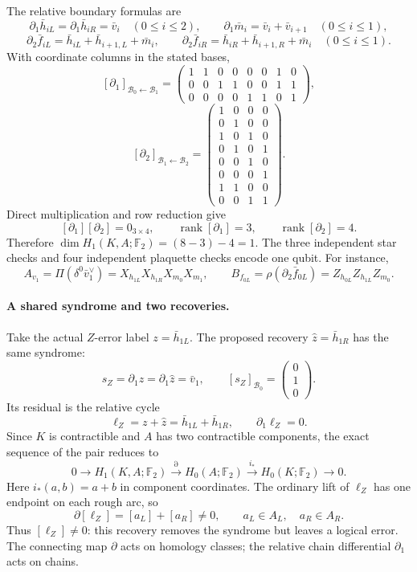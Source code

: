 The relative boundary formulas are
\[
 \partial_1\bar h_{iL}=\partial_1\bar h_{iR}=\bar v_i
 \quad(0\leq i\leq2),\qquad
 \partial_1\bar m_i=\bar v_i+\bar v_{i+1}\quad(0\leq i\leq1),
\]
\[
 \partial_2\bar f_{iL}=\bar h_{iL}+\bar h_{i+1,L}+\bar m_i,
 \qquad
 \partial_2\bar f_{iR}=\bar h_{iR}+\bar h_{i+1,R}+\bar m_i
 \quad(0\leq i\leq1).
\]
With coordinate columns in the stated bases,
\[
 [\partial_1]_{\mathcal B_0\leftarrow\mathcal B_1}
 =\begin{pmatrix}
 1&1&0&0&0&0&1&0\\
 0&0&1&1&0&0&1&1\\
 0&0&0&0&1&1&0&1
 \end{pmatrix},
\]
\[
 [\partial_2]_{\mathcal B_1\leftarrow\mathcal B_2}
 =\begin{pmatrix}
 1&0&0&0\\
 0&1&0&0\\
 1&0&1&0\\
 0&1&0&1\\
 0&0&1&0\\
 0&0&0&1\\
 1&1&0&0\\
 0&0&1&1
 \end{pmatrix}.
\]
Direct multiplication and row reduction give
\[
 [\partial_1][\partial_2]=0_{3\times4},\qquad
 \operatorname{rank}[\partial_1]=3,\qquad
 \operatorname{rank}[\partial_2]=4.
\]
Therefore $\dim H_1(K,A;\mathbb F_2)=(8-3)-4=1$. The three
independent star checks and four independent plaquette checks
encode one qubit. For instance,
\[
 A_{v_1}=\Pi(\delta^0\bar v_1^\vee)
 =X_{h_{1L}}X_{h_{1R}}X_{m_0}X_{m_1},
 \qquad
 B_{f_{0L}}=\rho(\partial_2\bar f_{0L})
 =Z_{h_{0L}}Z_{h_{1L}}Z_{m_0}.
\]

\paragraph{A shared syndrome and two recoveries.}
Take the actual $Z$-error label $z=\bar h_{1L}$. The proposed
recovery $\widehat z=\bar h_{1R}$ has the same syndrome:
\[
 s_Z=\partial_1z=\partial_1\widehat z=\bar v_1,
 \qquad [s_Z]_{\mathcal B_0}=\begin{pmatrix}0\\1\\0\end{pmatrix}.
\]
Its residual is the relative cycle
\[
 \ell_Z=z+\widehat z=\bar h_{1L}+\bar h_{1R},
 \qquad \partial_1\ell_Z=0.
\]
Since $K$ is contractible and $A$ has two contractible components,
the exact sequence of the pair reduces to
\[
 0\longrightarrow H_1(K,A;\mathbb F_2)
 \xrightarrow{\partial}H_0(A;\mathbb F_2)
 \xrightarrow{i_*}H_0(K;\mathbb F_2)\longrightarrow0.
\]
Here $i_*(a,b)=a+b$ in component coordinates. The ordinary lift of
$\ell_Z$ has one endpoint on each rough arc, so
\[
 \partial[\ell_Z]=[a_L]+[a_R]\ne0,
 \qquad a_L\in A_L,\quad a_R\in A_R.
\]
Thus $[\ell_Z]\ne0$: this recovery removes the syndrome but leaves
a logical error. The connecting map $\partial$ acts on homology
classes; the relative chain differential $\partial_1$ acts on chains.

